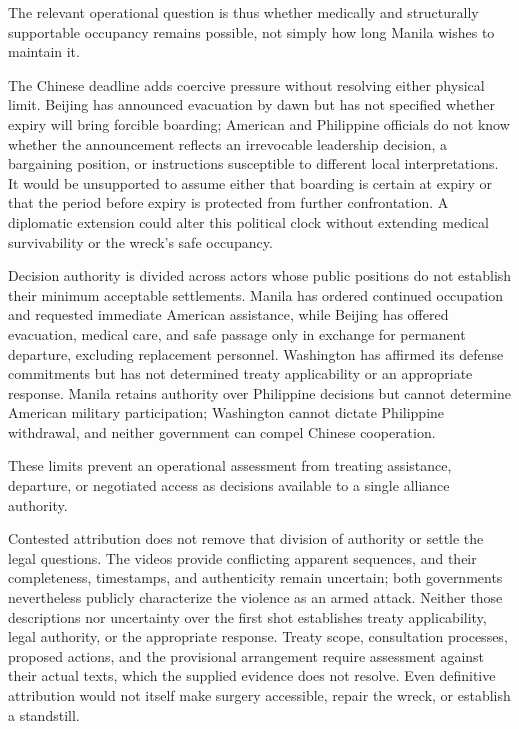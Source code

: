 \documentclass[11pt]{article}
\begin{document}
The relevant operational question is thus whether medically and structurally supportable occupancy remains possible, not simply how long Manila wishes to maintain it.

The Chinese deadline adds coercive pressure without resolving either physical limit. Beijing has announced evacuation by dawn but has not specified whether expiry will bring forcible boarding; American and Philippine officials do not know whether the announcement reflects an irrevocable leadership decision, a bargaining position, or instructions susceptible to different local interpretations. It would be unsupported to assume either that boarding is certain at expiry or that the period before expiry is protected from further confrontation. A diplomatic extension could alter this political clock without extending medical survivability or the wreck\textquoteright{}s safe occupancy.

Decision authority is divided across actors whose public positions do not establish their minimum acceptable settlements. Manila has ordered continued occupation and requested immediate American assistance, while Beijing has offered evacuation, medical care, and safe passage only in exchange for permanent departure, excluding replacement personnel. Washington has affirmed its defense commitments but has not determined treaty applicability or an appropriate response. Manila retains authority over Philippine decisions but cannot determine American military participation; Washington cannot dictate Philippine withdrawal, and neither government can compel Chinese cooperation.

These limits prevent an operational assessment from treating assistance, departure, or negotiated access as decisions available to a single alliance authority.

Contested attribution does not remove that division of authority or settle the legal questions. The videos provide conflicting apparent sequences, and their completeness, timestamps, and authenticity remain uncertain; both governments nevertheless publicly characterize the violence as an armed attack. Neither those descriptions nor uncertainty over the first shot establishes treaty applicability, legal authority, or the appropriate response. Treaty scope, consultation processes, proposed actions, and the provisional arrangement require assessment against their actual texts, which the supplied evidence does not resolve. Even definitive attribution would not itself make surgery accessible, repair the wreck, or establish a standstill.
\end{document}
